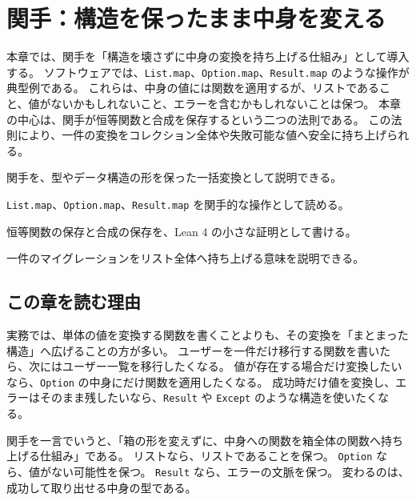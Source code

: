 \chapter{関手：構造を保ったまま中身を変える}
\label{chap:ch08_functor}

\begin{chapterabstract}
本章では、関手を「構造を壊さずに中身の変換を持ち上げる仕組み」として導入する。
ソフトウェアでは、\texttt{List.map}、\texttt{Option.map}、\texttt{Result.map} のような操作が典型例である。
これらは、中身の値には関数を適用するが、リストであること、値がないかもしれないこと、エラーを含むかもしれないことは保つ。
本章の中心は、関手が恒等関数と合成を保存するという二つの法則である。
この法則により、一件の変換をコレクション全体や失敗可能な値へ安全に持ち上げられる。
\end{chapterabstract}

\begin{learninggoals}
\item 関手を、型やデータ構造の形を保った一括変換として説明できる。
\item \texttt{List.map}、\texttt{Option.map}、\texttt{Result.map} を関手的な操作として読める。
\item 恒等関数の保存と合成の保存を、Lean 4 の小さな証明として書ける。
\item 一件のマイグレーションをリスト全体へ持ち上げる意味を説明できる。
\end{learninggoals}

\section{この章を読む理由}

実務では、単体の値を変換する関数を書くことよりも、その変換を「まとまった構造」へ広げることの方が多い。
ユーザーを一件だけ移行する関数を書いたら、次にはユーザー一覧を移行したくなる。
値が存在する場合だけ変換したいなら、\texttt{Option} の中身にだけ関数を適用したくなる。
成功時だけ値を変換し、エラーはそのまま残したいなら、\texttt{Result} や \texttt{Except} のような構造を使いたくなる。

\begin{intuitionbox}
関手を一言でいうと、「箱の形を変えずに、中身への関数を箱全体の関数へ持ち上げる仕組み」である。
リストなら、リストであることを保つ。
\texttt{Option} なら、値がない可能性を保つ。
\texttt{Result} なら、エラーの文脈を保つ。
変わるのは、成功して取り出せる中身の型である。
\end{intuitionbox}

